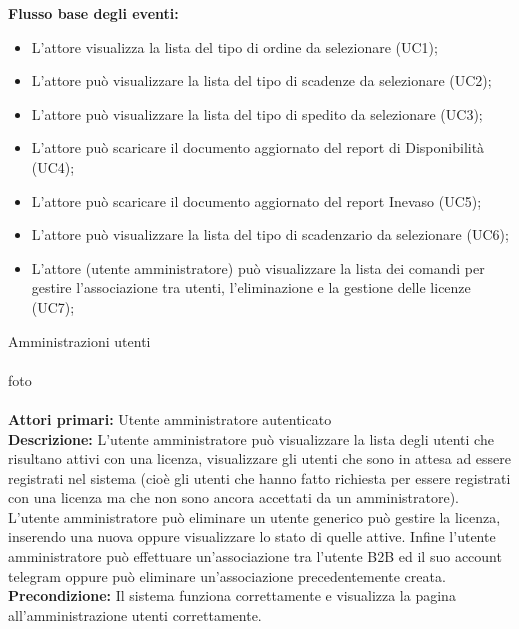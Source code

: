 \textbf{Flusso base degli eventi:}   
\begin{itemize}


\item L’attore visualizza la lista del tipo di ordine da selezionare (UC1);
\item L’attore può visualizzare la lista del tipo di scadenze da selezionare (UC2);
\item L’attore può visualizzare la lista del tipo di spedito da selezionare (UC3);
\item L’attore può scaricare il documento aggiornato  del report di Disponibilità (UC4);
\item L’attore può scaricare il documento aggiornato del report Inevaso (UC5);
\item L’attore può visualizzare la lista del tipo di scadenzario da selezionare (UC6);
\item L’attore (utente amministratore) può visualizzare la lista dei comandi per gestire l’associazione tra utenti, l’eliminazione e la gestione delle licenze (UC7);

\end{itemize}



Amministrazioni utenti \\\\

foto\\\\

\textbf{Attori primari:}   Utente amministratore autenticato\\


\textbf{Descrizione:} L’utente amministratore può visualizzare la lista degli utenti che risultano attivi con una licenza, visualizzare gli utenti che sono in attesa ad essere registrati nel sistema (cioè gli utenti che hanno fatto richiesta per essere registrati con una licenza ma che non sono ancora accettati da un amministratore). L’utente amministratore può eliminare un utente generico può gestire la licenza, inserendo una nuova oppure visualizzare lo stato di quelle attive. Infine l’utente amministratore può effettuare un’associazione tra l’utente B2B ed il suo account telegram oppure può eliminare un’associazione precedentemente creata. \\

\textbf{Precondizione:}   Il sistema funziona correttamente e visualizza la pagina all’amministrazione utenti correttamente. \\

